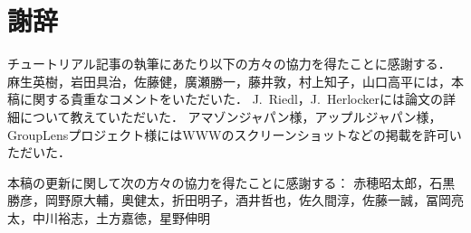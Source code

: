 \chapter*{謝辞}
\label{chap:ack}

チュートリアル記事の執筆にあたり以下の方々の協力を得たことに感謝する．
麻生英樹，岩田具治，佐藤健，廣瀬勝一，藤井敦，村上知子，山口高平には，本稿に関する貴重なコメントをいただいた．
J.~Riedl，J.~Herlockerには論文の詳細について教えていただいた．
アマゾンジャパン様，アップルジャパン様，GroupLensプロジェクト様にはWWWのスクリーンショットなどの掲載を許可いただいた．

本稿の更新に関して次の方々の協力を得たことに感謝する：
赤穂昭太郎，石黒勝彦，岡野原大輔，奧健太，折田明子，酒井哲也，佐久間淳，佐藤一誠，冨岡亮太，中川裕志，土方嘉徳，星野伸明
